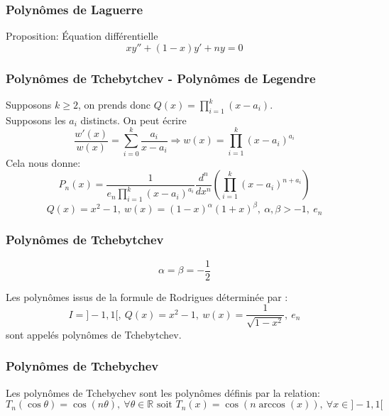 \documentclass[xcolor=dvipsnames,10pt,mathserif]{beamer}
\theoremstyle{plain}
\newcommand{\R}{\mathbb{R}}
\begin{document}
\begin{frame}\frametitle{Polynômes de Laguerre \hfill \insertpagenumber}
\begin{block}{Proposition: Équation différentielle}
\begin{equation}
xy''+(1-x)y'+ny=0
\end{equation}
\end{block}
\end{frame}

\begin{frame}\frametitle{Polynômes de Tchebytchev - Polynômes de Legendre\hfill \insertpagenumber}
Supposons $k\geq 2$, on prends donc $Q(x)=\prod\limits_{i=1}^{k}{(x-a_{i})}$.
\\Supposons les $ a_{i} $ distincts. On peut écrire 
\begin{equation}
\displaystyle{\dfrac{w'(x)}{w(x)}=\sum\limits_{i=0}^{k}{\dfrac{a_{i}}{x-a_{i}}} \Rightarrow w(x)= \prod\limits_{i=1}^{k}{(x-a_{i})^{a_{i}}}}
\end{equation}
Cela nous donne:
\begin{equation}
P_{n}(x)=\dfrac{1}{e_{n}\prod\limits_{i=1}^k{(x-a_i)^{a_i}}}\dfrac{d^{n}}{dx^{n}}(\prod\limits_{i=1}^{k}{(x-a_{i})^{n+a_{i}}})
\end{equation}
\begin{equation}
Q(x)=x^{2}-1,\ w(x)=(1-x)^{\alpha}(1+x)^{\beta},\ \alpha,\beta > -1,\ e_{n}
\end{equation}
\end{frame}


\begin{frame}\frametitle{Polynômes de Tchebytchev \hfill \insertpagenumber}
$$\alpha=\beta=-\dfrac{1}{2}$$
\begin{block}{}
Les polynômes issus de la formule de Rodrigues déterminée par : 
\begin{equation}
I=]-1,1[,\ Q(x)=x^{2}-1,\ w(x)=\dfrac{1}{\sqrt{1-x^{2}}},\ e_{n}
\end{equation}
sont appelés polynômes de Tchebytchev.
\end{block}
\end{frame}


\begin{frame}\frametitle{Polynômes de Tchebychev \hfill \insertpagenumber}
\begin{block}{}
Les polynômes de Tchebychev sont les polynômes définis par la relation:
\begin{equation}
T_{n}(\cos \theta)=\cos (n\theta),\ \forall \theta \in \R \text{ soit }  T_{n}(x)=\cos (n\arccos(x)),\ \forall x \in ]-1, 1[
\end{equation}
\end{block}
\end{frame}
\end{document}
